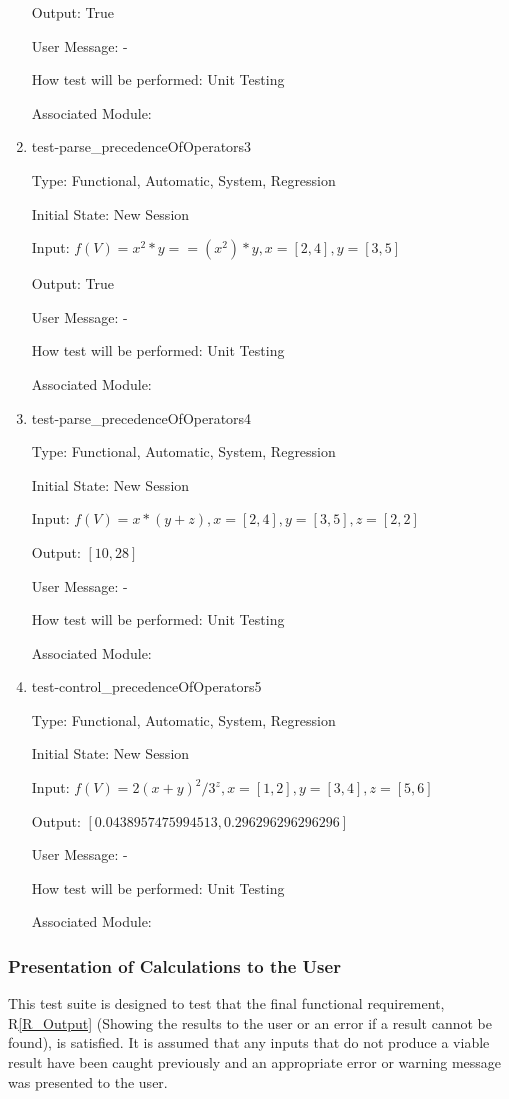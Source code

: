 \documentclass[12pt, titlepage]{article}
\newcommand{\rref}[1]{R\ref{#1}}
\begin{document}
\begin{enumerate}
	Output: True
	
	User Message: - 
	
	How test will be performed: Unit Testing
	
	Associated Module: \\
	
	\item{test-parse\_precedenceOfOperators3}
	
	Type: Functional, Automatic, System, Regression
	
	Initial State: New Session
	
	Input: $f(V) = x^2 * y == (x^2) * y, x = [2,4], y = [3,5]$
	
	Output: True
	
	User Message: - 
	
	How test will be performed: Unit Testing
	
	Associated Module: \\
	
	\item{test-parse\_precedenceOfOperators4}
	
	Type: Functional, Automatic, System, Regression
	
	Initial State: New Session
	
	Input: $f(V) = x * (y + z), x = [2,4], y = [3,5], z = [2,2]$
	
	Output: $[10, 28]$
	
	User Message: - 
	
	How test will be performed: Unit Testing
	
	Associated Module: \\
	
	\item{test-control\_precedenceOfOperators5}
	\label{userstudy_task}
	
	Type: Functional, Automatic, System, Regression
	
	Initial State: New Session
	
	Input: $f(V) = 2(x + y)^2/3^z, x = [1,2], y = [3,4], z = [5,6]$
	
	Output: $[0.0438957475994513, 0.296296296296296]$
	
	User Message: - 
	
	How test will be performed: Unit Testing
	
	Associated Module: \\
	
\end{enumerate}

\subsubsection{Presentation of Calculations to the User}
\label{tests_outputResults}
This test suite is designed to test that the final functional requirement, 
\rref{R_Output} (Showing the results to the user or an error if a result cannot 
be found), is satisfied. It is assumed that any 
inputs that do not produce a viable result have been caught previously and an 
appropriate error or warning message was presented to the user.
\end{document}
